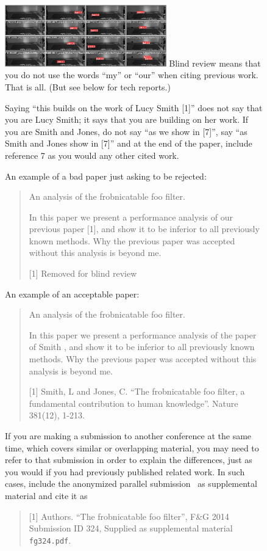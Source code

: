\documentclass[10pt,twocolumn,letterpaper]{article}
\begin{document}
\begin{figure}{
  \includegraphics[width=7cm]{validation.jpeg}
}
Blind review means that you do not use the words ``my'' or ``our'' when citing previous work.
That is all.
(But see below for tech reports.)

Saying ``this builds on the work of Lucy Smith [1]'' does not say that you are Lucy Smith;
it says that you are building on her work.
If you are Smith and Jones, do not say ``as we show in [7]'', say ``as Smith and Jones show in [7]'' and at the end of the paper, include reference 7 as you would any other cited work.

An example of a bad paper just asking to be rejected:
\begin{quote}
\begin{center}
    An analysis of the frobnicatable foo filter.
\end{center}

   In this paper we present a performance analysis of our previous paper [1], and show it to be inferior to all previously known methods.
   Why the previous paper was accepted without this analysis is beyond me.

   [1] Removed for blind review
\end{quote}


An example of an acceptable paper:
\begin{quote}
\begin{center}
     An analysis of the frobnicatable foo filter.
\end{center}

   In this paper we present a performance analysis of the  paper of Smith \etal [1], and show it to be inferior to all previously known methods.
   Why the previous paper was accepted without this analysis is beyond me.

   [1] Smith, L and Jones, C. ``The frobnicatable foo filter, a fundamental contribution to human knowledge''. Nature 381(12), 1-213.
\end{quote}

If you are making a submission to another conference at the same time, which covers similar or overlapping material, you may need to refer to that submission in order to explain the differences, just as you would if you had previously published related work.
In such cases, include the anonymized parallel submission~\cite{Authors14} as supplemental material and cite it as
\begin{quote}
[1] Authors. ``The frobnicatable foo filter'', F\&G 2014 Submission ID 324, Supplied as supplemental material {\tt fg324.pdf}.
\end{quote}


\end{figure}
\end{document}
